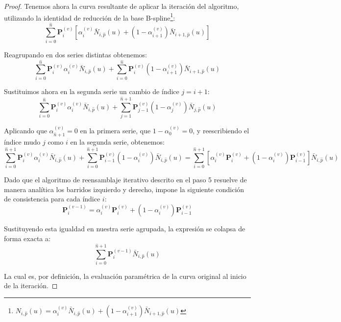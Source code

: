 \documentclass[11pt]{book}
\theoremstyle{plain} %
\theoremstyle{definition} %
\theoremstyle{definition} %
\begin{document}
\begin{itemize}
\begin{proof}
        Tenemos ahora la curva resultante de aplicar la iteración del algoritmo, utilizando la identidad de reducción de la base B-spline\footnote{$N_{i,\hat{p}}(u) = \alpha_i^{(v)} \bar{N}_{i,\hat{p}}(u) + (1 - \alpha_{i+1}^{(v)}) \bar{N}_{i+1,\hat{p}}(u)$}: 
        $$\sum_{i=0}^{\hat{n}} \mathbf{P}^{(v)}_i \left[ \alpha_i^{(v)} \bar{N}_{i,\hat{p}}(u) + (1 - \alpha_{i+1}^{(v)}) \bar{N}_{i+1,\hat{p}}(u) \right]$$
        
        Reagrupando en dos series distintas obtenemos:
        $$\sum_{i=0}^{\hat{n}} \mathbf{P}^{(v)}_i \alpha_i^{(v)} \bar{N}_{i,\hat{p}}(u) + \sum_{i=0}^{\hat{n}} \mathbf{P}^{(v)}_i (1 - \alpha_{i+1}^{(v)}) \bar{N}_{i+1,\hat{p}}(u)$$
    
        Sustituimos ahora en la segunda serie un cambio de índice $j=i+1$:
        $$\sum_{i=0}^{\hat{n}} \mathbf{P}^{(v)}_i \alpha_i^{(v)} \bar{N}_{i,\hat{p}}(u) + \sum_{j=1}^{\hat{n}+1} \mathbf{P}^{(v)}_{j-1} (1 - \alpha_j^{(v)}) \bar{N}_{j,\hat{p}}(u)$$

        Aplicando que $\alpha_{\hat{n}+1}^{(v)}=0$ en la primera serie, que $1-\alpha_0^{(v)}=0$, y reescribiendo el índice mudo $j$ como $i$ en la segunda serie, obtenemos:
        $$\sum_{i=0}^{\hat{n}+1} \mathbf{P}^{(v)}_i \alpha_i^{(v)} \bar{N}_{i,\hat{p}}(u) + \sum_{i=0}^{\hat{n}+1} \mathbf{P}^{(v)}_{i-1} (1 - \alpha_i^{(v)}) \bar{N}_{i,\hat{p}}(u) = \sum_{i=0}^{\hat{n}+1} \left[ \alpha_i^{(v)} \mathbf{P}^{(v)}_i + (1 - \alpha_i^{(v)}) \mathbf{P}^{(v)}_{i-1} \right] \bar{N}_{i,\hat{p}}(u)$$
        
        Dado que el algoritmo de reensamblaje iterativo descrito en el paso 5 resuelve de manera analítica los barridos izquierdo y derecho, impone la siguiente condición de consistencia para cada índice $i$:
        $$\mathbf{P}^{(v-1)}_i = \alpha_i^{(v)} \mathbf{P}^{(v)}_i + (1 - \alpha_i^{(v)}) \mathbf{P}^{(v)}_{i-1}$$

        Sustituyendo esta igualdad en nuestra serie agrupada, la expresión se colapsa de forma exacta a:
        $$\sum_{i=0}^{\hat{n}+1} \mathbf{P}^{(v-1)}_i \bar{N}_{i,\hat{p}}(u)$$
        
        La cual es, por definición, la evaluación paramétrica de la curva original al inicio de la iteración.
    \end{proof}
\end{itemize}
\end{document}
